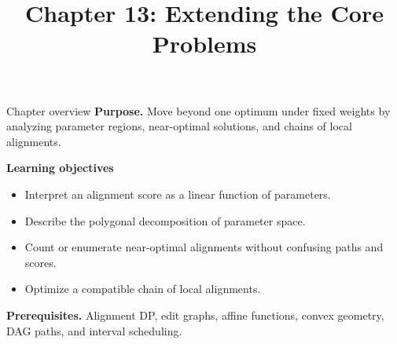 \documentclass[11pt,letterpaper]{article}
\title{Chapter 13: Extending the Core Problems}
\author{}
\date{}
\begin{document}
\maketitle

\begin{CornellOverviewBox}{Chapter overview}
\textbf{Purpose.} Move beyond one optimum under fixed weights by analyzing parameter regions, near-optimal solutions, and chains of local alignments.

\textbf{Learning objectives}
\begin{itemize}
  \item Interpret an alignment score as a linear function of parameters.
  \item Describe the polygonal decomposition of parameter space.
  \item Count or enumerate near-optimal alignments without confusing paths and scores.
  \item Optimize a compatible chain of local alignments.
\end{itemize}

\textbf{Prerequisites.} Alignment DP, edit graphs, affine functions, convex geometry, DAG paths, and interval scheduling.
\end{CornellOverviewBox}
\end{document}
